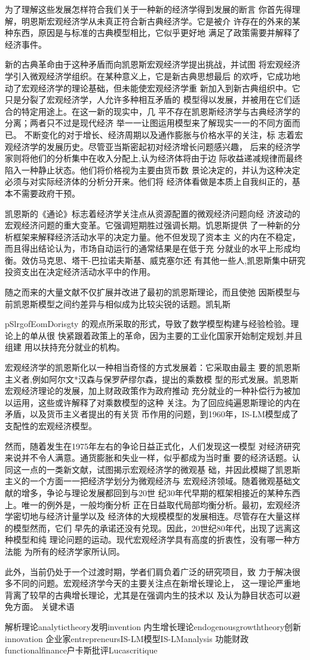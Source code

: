为了理解这些发展怎样符合我们关于一种新的经济学得到发展的断言
你首先得理解，明恩斯宏观经济学从未真正符合新古典经济学。它是被介
许存在的外来的某种东西，原因是与标准的古典模型相比，它似乎更好地
满足了政策需要并解释了经济事件。

新的古典革命由于这种矛盾而向凯恩斯宏观经济学提出挑战，并试图
将宏观经济学引入微观经济学组织。在某种意义上，它是新古典思想最后
的欢呼，它成功地动了宏观经济学的理论基础，但未能使宏观经济学重
新加入到新古典组织中。它只是分裂了宏观经济学，人允许多种相互矛盾的
模型得以发展，并被用在它们适合的特定用途上。在这一新的现实中，几
平不存在凯恩斯经济学与古典经济学的分离；两者只不过是现代经济
举一一让图运用模型来了解现实一一的不同方面而已。
不断变化的对于增长、经济周期以及通作膨胀与价格水平的关注，标
志着宏观经济学的发展历史。尽管亚当斯密起初对经济增长问题感兴趣，
后来的经济学家则将他们的分析集中在收入分配上,认为经济体将由于边
际收益递减规律而最终陷入一种静止状态。他们将价格视为主要由货币数
景论决定的，并认为这种决定必须与对实际经济体的分析分开来。他们将
经济体看做是本质上自我纠正的，基本不需要政府干预。

凯恩斯的《通论》标志着经济学关注点从资源配置的微观经济问题向经
济波动的宏观经济问题的重大变革。它强调短期胜过强调长期。饥恩斯提供
了一种新的分析框架来解释经济活动水平的决定力量。他不但发现了资本主
义的内在不稳定，而且得出结论认为，市场自动运行的通常结果是在低于充
分就业的水平上形成均衡。效仿马克思、塔干-巴拉诺夫斯基、威克塞尔还
有其他一些人,凯恩斯集中研究投资支出在决定经济活动水平中的作用。

随之而来的大量文献不仅扩展并改进了最初的凯恩斯理论，而且使弛
因斯模型与前凯恩斯模型之间约差异与相似成为比较尖锐的话题。凯轧斯

pSlrgofEomDorisgty
的观点所采取的形式，导致了数学模型构建与经验检验。理论上的单从很
快紧跟着政策上的革命，因为主要的工业化国家开始制定规划,并且组建
用以扶持充分就业的机构。

宏观经济学的凯恩斯化以一种相当奇怪的方式发展着：它采取由最主
要的凯恩斯主义者,例如阿尔文*汉森与保罗萨缪尔森，提出的乘数模
型的形式发展。凯恩斯宏观经济理论的发展，加上财政政策作为政府推动
充分就业的一种补偿行为被加以运用，这些或许解释了对乘数模型的这种
关注。为了回应纯遍恩斯理论的内在矛盾，以及货币主义者提出的有关货
币作用的问题，到1960年，IS-LM模型成了支配性的宏观经济模型。

然而，随着发生在1975年左右的争论日益正式化，人们发现这一模型
对经济研究来说并不令人满意。通货膨胀和失业一样，似乎都成为当时重
要的经济话题。认同这一点的一类新文献，试图揭示宏观经济学的微观基
础，并因此模糊了凯恩斯主义的一个方面一一把经济学划分为微观经济与
宏观经济领域。随着微观基础文献的增多，争论与理论发展都回到与20世
纪30年代早期的框架相接近的某种东西上。唯一的例外是，一般均衡分析
正在日益取代局部均衡分析。最初，宏观经济学密切地与经济计量学以及
经济体的大规模模型的发展相连。尽管存在大量这样的模型然而，它们
早先的承诺还没有兑现。因此，20世纪80年代，出现了远离这种模型和纯
理论问题的运动。现代宏观经济学具有高度的折衷性，没有哪一种方法能
为所有的经济学家所认同。

此外，当前仍处于一个过渡时期，学者们肩负着广泛的研究项目，致
力于解决很多不同的问题。宏观经济学今天的主要关注点在新增长理论上，
这一理论严重地背离了较早的古典增长理论，尤其是在强调内生的技术以
及认为静目状态可以避免方面。
关键术语

解析理论analytictheory发明invention
内生增长理论endogenousgrowththeory创新innovation
企业家entrepreneursIS-LM模型IS-LManalysis
功能财政functionalfinance户卡斯批评Lucascritique
